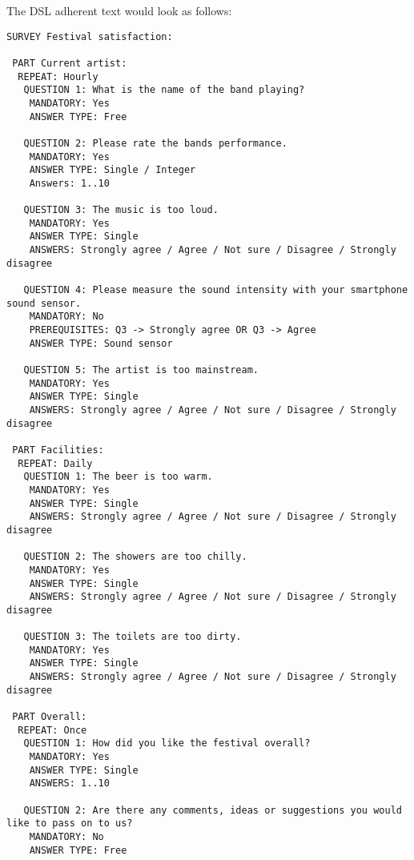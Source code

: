The DSL adherent text would look as follows:
\begin{verbatim}
SURVEY Festival satisfaction:

 PART Current artist:
  REPEAT: Hourly
   QUESTION 1: What is the name of the band playing?
    MANDATORY: Yes
    ANSWER TYPE: Free
      
   QUESTION 2: Please rate the bands performance.
    MANDATORY: Yes
    ANSWER TYPE: Single / Integer
    Answers: 1..10

   QUESTION 3: The music is too loud.
    MANDATORY: Yes
    ANSWER TYPE: Single
    ANSWERS: Strongly agree / Agree / Not sure / Disagree / Strongly disagree
    
   QUESTION 4: Please measure the sound intensity with your smartphone sound sensor.
    MANDATORY: No
    PREREQUISITES: Q3 -> Strongly agree OR Q3 -> Agree
    ANSWER TYPE: Sound sensor
    
   QUESTION 5: The artist is too mainstream.
    MANDATORY: Yes
    ANSWER TYPE: Single
    ANSWERS: Strongly agree / Agree / Not sure / Disagree / Strongly disagree
    
 PART Facilities:
  REPEAT: Daily
   QUESTION 1: The beer is too warm.
    MANDATORY: Yes
    ANSWER TYPE: Single
    ANSWERS: Strongly agree / Agree / Not sure / Disagree / Strongly disagree
    
   QUESTION 2: The showers are too chilly.
    MANDATORY: Yes
    ANSWER TYPE: Single
    ANSWERS: Strongly agree / Agree / Not sure / Disagree / Strongly disagree
    
   QUESTION 3: The toilets are too dirty.
    MANDATORY: Yes
    ANSWER TYPE: Single
    ANSWERS: Strongly agree / Agree / Not sure / Disagree / Strongly disagree
    
 PART Overall:
  REPEAT: Once
   QUESTION 1: How did you like the festival overall?
    MANDATORY: Yes
    ANSWER TYPE: Single
    ANSWERS: 1..10
    
   QUESTION 2: Are there any comments, ideas or suggestions you would like to pass on to us?
    MANDATORY: No
    ANSWER TYPE: Free
\end{verbatim}